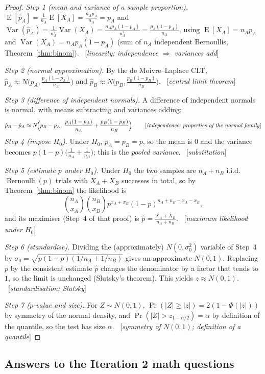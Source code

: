 \documentclass[11pt]{article}
\theoremstyle{definition}
\theoremstyle{remark}
\renewcommand{\Pr}{\operatorname{Pr}}
\newcommand{\E}{\operatorname{E}}
\newcommand{\Var}{\operatorname{Var}}
\newcommand{\Ber}{\operatorname{Bernoulli}}
\newcommand{\rulename}[1]{\ {[\emph{#1}]}}
\begin{document}
\begin{proof}
\emph{Step 1 (mean and variance of a sample proportion).}
$\E[\hat p_A]=\frac1{n_A}\E[X_A]=\frac{n_Ap_A}{n_A}=p_A$ and
$\Var(\hat p_A)=\frac1{n_A^2}\Var(X_A)=\frac{n_Ap_A(1-p_A)}{n_A^2}=\frac{p_A(1-p_A)}{n_A}$, using
$\E[X_A]=n_Ap_A$ and $\Var(X_A)=n_Ap_A(1-p_A)$ (sum of $n_A$ independent Bernoullis, Theorem~\ref{thm:binom}).
\rulename{linearity; independence $\Rightarrow$ variances add}

\emph{Step 2 (normal approximation).} By the de Moivre--Laplace CLT,
$\hat p_A\approx N\big(p_A,\frac{p_A(1-p_A)}{n_A}\big)$ and $\hat p_B\approx N\big(p_B,\frac{p_B(1-p_B)}{n_B}\big)$.
\rulename{central limit theorem}

\emph{Step 3 (difference of independent normals).} A difference of independent normals is normal, with
means subtracting and variances adding:
\[
\hat p_B-\hat p_A\approx N\!\Big(p_B-p_A,\;\frac{p_A(1-p_A)}{n_A}+\frac{p_B(1-p_B)}{n_B}\Big).
\tag*{[\emph{independence; properties of the normal family}]}
\]
\emph{Step 4 (impose $H_0$).} Under $H_0$, $p_A=p_B=p$, so the mean is $0$ and the variance becomes
$p(1-p)\big(\frac1{n_A}+\frac1{n_B}\big)$; this is the \emph{pooled variance}.
\rulename{substitution}

\emph{Step 5 (estimate $p$ under $H_0$).} Under $H_0$ the two samples are $n_A+n_B$ i.i.d.\ $\Ber(p)$ trials
with $X_A+X_B$ successes in total, so by Theorem~\ref{thm:binom} the likelihood is
\[
\binom{n_A}{x_A}\binom{n_B}{x_B}p^{x_A+x_B}(1-p)^{n_A+n_B-x_A-x_B},
\]
and its maximiser (Step~4 of that proof) is $\hat p=\frac{X_A+X_B}{n_A+n_B}$. \rulename{maximum likelihood under $H_0$}

\emph{Step 6 (standardise).} Dividing the (approximately) $N(0,\sigma_0^2)$ variable of Step~4 by
$\sigma_0=\sqrt{p(1-p)(1/n_A+1/n_B)}$ gives an approximate $N(0,1)$. Replacing $p$ by the consistent estimate
$\hat p$ changes the denominator by a factor that tends to $1$, so the limit is unchanged (Slutsky's theorem).
This yields $z\approx N(0,1)$. \rulename{standardisation; Slutsky}

\emph{Step 7 ($p$-value and size).} For $Z\sim N(0,1)$, $\Pr(|Z|\ge|z|)=2(1-\Phi(|z|))$ by symmetry of the normal
density, and $\Pr(|Z|>z_{1-\alpha/2})=\alpha$ by definition of the quantile, so the test has size $\alpha$.
\rulename{symmetry of $N(0,1)$; definition of a quantile}
\end{proof}

\subsection{Answers to the Iteration 2 math questions}\label{sec:questions}
\end{document}
